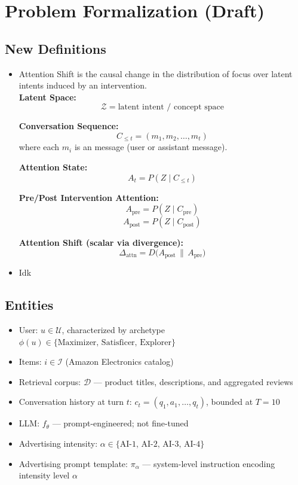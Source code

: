 \documentclass{article}
\begin{document}
\section{Problem Formalization (Draft)}

\subsection{New Definitions}

\begin{itemize}
    \item  Attention Shift is the causal change in the distribution of focus over latent intents induced by an intervention.
    \\ 
            
        \textbf{Latent Space:}
        \[
        \mathcal{Z} = \text{latent intent / concept space}
        \]
        
        \textbf{Conversation Sequence:}
        \[
        C_{\leq t} = (m_1, m_2, \dots, m_t)
        \]
        where each \(m_i\) is an message (user or assistant message).
        
        \textbf{Attention State:}
        \[
        A_t = P(Z \mid C_{\leq t})
        \]
        
        \textbf{Pre/Post Intervention Attention:}
        \[
        A_{\text{pre}} = P(Z \mid C_{\text{pre}})
        \]
        \[
        A_{\text{post}} = P(Z \mid C_{\text{post}})
        \]
        
        \textbf{Attention Shift (scalar via divergence):}
        \[
        \Delta_{\text{attn}} = D\big(A_{\text{post}} \,\|\, A_{\text{pre}}\big)
        \]
    \item Idk

\end{itemize}

 
\subsection{Entities}
 
\begin{itemize}
    \item User: $u \in \mathcal{U}$, characterized by archetype $\phi(u) \in \{\text{Maximizer, Satisficer, Explorer}\}$
    \item Items: $i \in \mathcal{I}$ (Amazon Electronics catalog)
    \item Retrieval corpus: $\mathcal{D}$ — product titles, descriptions, and aggregated reviews
    \item Conversation history at turn $t$: $c_t = (q_1, a_1, \ldots, q_t)$, bounded at $T = 10$
    \item LLM: $f_\theta$ — prompt-engineered; not fine-tuned
    \item Advertising intensity: $\alpha \in \{\text{AI-1, AI-2, AI-3, AI-4}\}$
    \item Advertising prompt template: $\pi_\alpha$ — system-level instruction encoding intensity level $\alpha$
\end{itemize}
 
\end{document}
